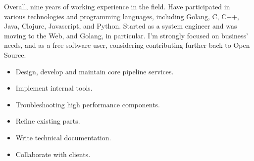 \documentclass[10pt,a4paper,ragged2e,withhyper]{altacv}
\begin{document}


\makecvheader


Overall, nine years of working experience in the field. Have participated in
various technologies and programming languages, including Golang, C, C++, Java,
Clojure, Javascript, and Python. Started as a system engineer and was moving to
the Web, and Golang, in particular. I'm strongly focused on business' needs, and
as a free software user, considering contributing further back to Open Source.




    
 

\divider


          
\cvtag{\LaTeX{}}    

\begin{itemize}
\item Design, develop and maintain core pipeline services.
\item Implement internal tools.
\item Troubleshooting high performance components.
\item Refine existing parts.
\item Write technical documentation.
\item Collaborate with clients.
\end{itemize}
\end{document}
